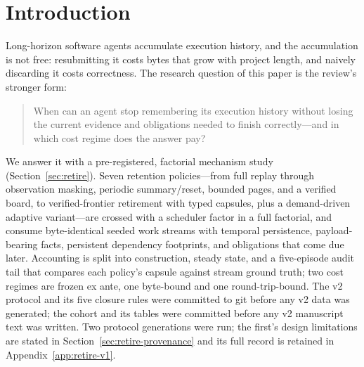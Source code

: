 \section{Introduction}\label{sec:intro}
Long-horizon software agents accumulate execution history, and the
accumulation is not free: resubmitting it costs bytes that grow with
project length, and naively discarding it costs correctness. The
research question of this paper is the review's stronger form:

\begin{quote}
When can an agent stop remembering its execution history without
losing the current evidence and obligations needed to finish
correctly---and in which cost regime does the answer pay?
\end{quote}

We answer it with a pre-registered, factorial mechanism study
(Section~\ref{sec:retire}). Seven retention policies---from full
replay through observation masking, periodic summary/reset, bounded
pages, and a verified board, to verified-frontier retirement with
typed capsules, plus a demand-driven adaptive variant---are crossed
with a scheduler factor in a full factorial, and consume
byte-identical seeded work streams with temporal persistence,
payload-bearing facts, persistent dependency footprints, and
obligations that come due later. Accounting is split into
construction, steady state, and a five-episode audit tail that
compares each policy's capsule against stream ground truth; two cost
regimes are frozen ex ante, one byte-bound and one round-trip-bound.
The v2 protocol and its five closure rules were committed to git
before any v2 data was generated; the cohort and its tables were
committed before any v2 manuscript text was written. Two protocol
generations were run; the first's design limitations are stated in
Section~\ref{sec:retire-provenance} and its full record is retained in
Appendix~\ref{app:retire-v1}.

